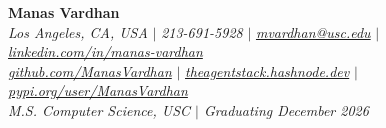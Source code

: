 \documentclass[letterpaper,10pt]{article}
\newcommand{\sectionspace}{\vspace{-6pt}}
\begin{document}
\begin{center}
    \textbf{\LARGE Manas Vardhan} \\ \vspace{1mm}
    \textit{Los Angeles, CA, USA} $|$ \textit{213-691-5928} $|$
    \href{mailto:mvardhan@usc.edu}{\textit{mvardhan@usc.edu}} $|$
    \href{http://www.linkedin.com/in/manas-vardhan/}{\textit{linkedin.com/in/manas-vardhan}} \\
    \href{https://github.com/ManasVardhan}{\textit{github.com/ManasVardhan}} $|$
    \href{https://theagentstack.hashnode.dev/}{\textit{theagentstack.hashnode.dev}} $|$
    \href{https://pypi.org/user/ManasVardhan/}{\textit{pypi.org/user/ManasVardhan}} \\ \vspace{1mm}
    \textit{M.S. Computer Science, USC $|$ Graduating December 2026}
\end{center}


\end{document}
